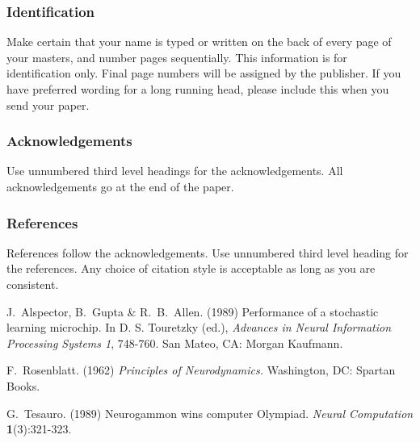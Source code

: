 \documentclass{article} %
\begin{document}
\subsubsection{Identification} 

Make certain that your name is typed or written on the back of
every page of your masters, and number pages sequentially. This
information is for identification only. Final page numbers will be
assigned by the publisher. If you have preferred wording for a long
running head, please include this when you send your paper. 

\subsubsection*{Acknowledgements}

Use unnumbered third level headings for the acknowledgements.  All
acknowledgements go at the end of the paper.


\subsubsection*{References}

References follow the acknowledgements.  Use unnumbered third level
heading for the references.  Any choice of citation style is
acceptable as long as you are consistent.


J.~Alspector, B.~Gupta \& R.~B.~Allen.  (1989) Performance of a
stochastic learning microchip.  In D. S. Touretzky (ed.), {\it
Advances in Neural Information Processing Systems 1}, 748-760.  San
Mateo, CA: Morgan Kaufmann.

F.~Rosenblatt. (1962) {\it Principles of Neurodynamics.}
Washington, DC: Spartan Books.

G.~Tesauro. (1989) Neurogammon wins computer Olympiad.  {\it Neural
Computation} {\bf 1}(3):321-323.
\end{document}
